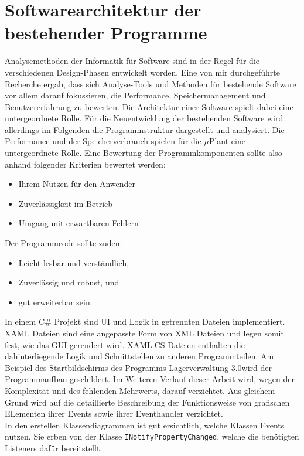 

\chapter{Softwarearchitektur der bestehender Programme}

    Analysemethoden der Informatik für Software sind in der Regel für die verschiedenen Design-Phasen entwickelt worden.
    Eine von mir durchgeführte Recherche ergab, dass sich Analyse-Tools und Methoden für bestehende Software vor
    allem darauf fokussieren, die Performance, Speichermanagement und Benutzererfahrung zu bewerten.
    Die Architektur einer Software spielt dabei eine untergeordnete Rolle.
    Für die Neuentwicklung der bestehenden Software wird allerdings im Folgenden die Programmstruktur dargestellt und analysiert.
    Die Performance und der Speicherverbrauch spielen für die $\mu$Plant eine untergeordnete Rolle.
    Eine Bewertung der Programmkomponenten sollte also anhand folgender Kriterien bewertet werden:

    \begin{itemize}
        \item Ihrem Nutzen für den Anwender
        \item Zuverlässigkeit im Betrieb
        \item Umgang mit erwartbaren Fehlern
    \end{itemize}

    Der Programmcode sollte zudem
    \begin{itemize}
        \item Leicht lesbar und verständlich,
        \item Zuverlässig und robust, und
        \item gut erweiterbar sein.
    \end{itemize}
    In einem C$\#$ Projekt sind UI und Logik in getrennten Dateien implementiert.
    XAML Dateien sind eine angepasste Form von XML Dateien und legen somit fest, wie das GUI gerendert wird.
    XAML.CS Dateien enthalten die dahinterliegende Logik und Schnittstellen zu anderen Programmteilen.
    Am Beispiel des Startbildschirms des Programms \glqq Lagerverwaltung 3.0\grqq wird der Programmaufbau geschildert.
    Im Weiteren Verlauf dieser Arbeit wird, wegen der Komplexität und des fehlenden Mehrwerts, darauf verzichtet.
    Aus gleichem Grund wird auf die detaillierte Beschreibung der Funktionsweise von grafischen ELementen ihrer Events
    sowie ihrer Eventhandler verzichtet.
    \\
    In den erstellen Klassendiagrammen ist gut ersichtlich, welche Klassen Events nutzen.
    Sie erben von der Klasse \verb|INotifyPropertyChanged|, welche die benötigten Listeners dafür bereitstellt.

